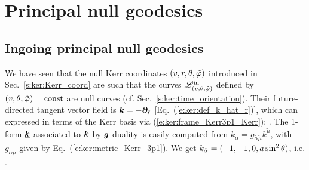 
\section{Principal null geodesics} \label{s:ker:principal_geod}

\subsection{Ingoing principal null geodesics}

We have seen that the null Kerr coordinates $(v,r,\theta,{\tilde\varphi})$ introduced in
Sec.~\ref{s:ker:Kerr_coord} are such that
the curves $\mathscr{L}^{\rm in}_{(v,\theta,{\tilde\varphi})}$ defined by $(v,\theta,{\tilde\varphi})=\mathrm{const}$ are null curves
(cf. Sec.~\ref{s:ker:time_orientation}). Their future-directed tangent
vector field is $\bm{k} = -\bm{\partial}_{\hat{r}}$ [Eq.~(\ref{e:ker:def_k_hat_r})], which
can expressed in terms of the Kerr
basis via (\ref{e:ker:frame_Kerr3p1_Kerr}):
\be \label{e:ker:k_ti_tr}
    .
\ee
The 1-form $\underline{\bm{k}}$ associated to $\bm{k}$ by $\bm{g}$-duality is easily computed
from $k_{\tilde{\alpha}} = g_{\tilde{\alpha}\tilde{\mu}} k^{\tilde{\mu}}$, with
$g_{\tilde{\alpha}\tilde{\mu}}$ given by
Eq.~(\ref{e:ker:metric_Kerr_3p1}). We get
$k_{\tilde{\alpha}} = (-1, -1, 0, a\sin^2\theta)$, i.e.
\be \label{e:ker:k_form_Kerr}
     .
\ee

